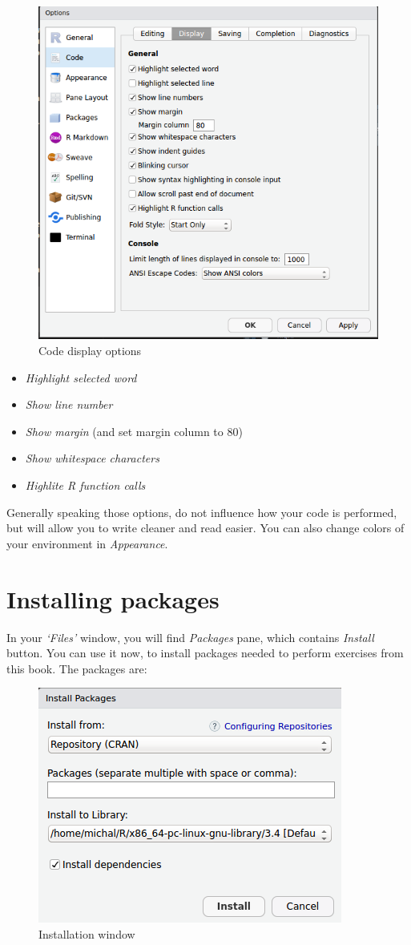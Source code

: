 \documentclass[]{book}
\providecommand{\tightlist}{%
  \setlength{\itemsep}{0pt}\setlength{\parskip}{0pt}}
\theoremstyle{definition}
\theoremstyle{definition}
\theoremstyle{definition}
\theoremstyle{remark}
\begin{document}
\begin{figure}

{\centering \includegraphics[width=0.5\linewidth]{options} 

}

\caption{Code display options}\label{fig:option-settings}
\end{figure}

\begin{itemize}
\tightlist
\item
  \emph{Highlight selected word}
\item
  \emph{Show line number}
\item
  \emph{Show margin} (and set margin column to 80)
\item
  \emph{Show whitespace characters}
\item
  \emph{Highlite R function calls}
\end{itemize}

Generally speaking those options, do not influence how your code is
performed, but will allow you to write cleaner and read easier. You can
also change colors of your environment in \emph{Appearance}.

\section{Installing packages}\label{installing-packages}

In your \emph{`Files'} window, you will find \emph{Packages} pane, which
contains \emph{Install} button. You can use it now, to install packages
needed to perform exercises from this book. The packages are:

\begin{figure}

{\centering \includegraphics[width=0.5\linewidth]{instalPacks} 

}

\caption{Installation window}\label{fig:install-packs}
\end{figure}
\end{document}
